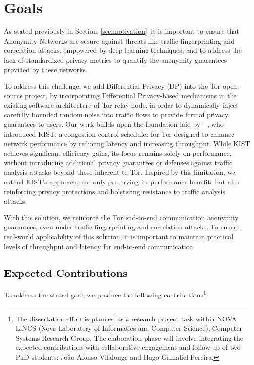\section{Goals}\label{sec:goals}

As stated previously in Section~\ref{sec:motivation}, it is important to ensure that Anonymity Networks are secure against threats like traffic fingerprinting and correlation attacks, empowered by deep learning techniques, and to address the lack of standardized privacy metrics to quantify the anonymity guarantees provided by these networks.

To address this challenge, we add Differential Privacy (DP) into the Tor open-source project, by incorporating Differential Privacy-based mechanisms in the existing software architecture of Tor relay node, in order to dynamically inject carefully bounded random noise into traffic flows to provide formal privacy guarantees to users. 
Our work builds upon the foundation laid by~\citeauthor{KIST}~\cite{KIST}, who introduced KIST, a congestion control scheduler for Tor designed to enhance network performance by reducing latency and increasing throughput. While KIST achieves significant efficiency gains, its focus remains solely on performance, without introducing additional privacy guarantees or defenses against traffic analysis attacks beyond those inherent to Tor. Inspired by this limitation, we extend KIST's approach, not only preserving its performance benefits but also reinforcing privacy protections and bolstering resistance to traffic analysis attacks.

With this solution, we reinforce the Tor end-to-end communication anonymity guarantees, even under traffic fingerprinting and correlation attacks. To ensure real-world applicability of this solution, it is important to maintain practical levels of throughput and latency for end-to-end communication. 

\subsection{Expected Contributions}\label{sub:contributions}

To address the stated goal, we produce the following contributions\footnote{The dissertation effort is planned as a research project task within NOVA LINCS (Nova Laboratory of Informatics and Computer Science), Computer Systems Research Group. The elaboration phase will involve integrating the expected contributions with collaborative engagement and follow-up of two PhD students: João Afonso Vilalonga and Hugo Gamaliel Pereira.}:

